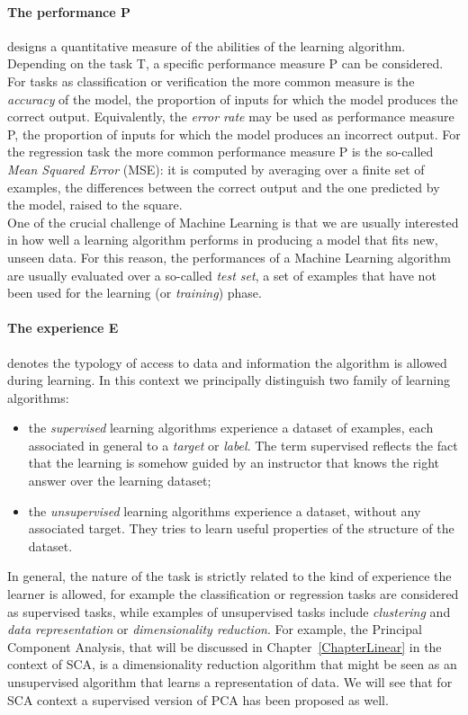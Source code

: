 \paragraph*{The performance P} designs a quantitative measure of the abilities of the learning algorithm. Depending on the task T, a specific performance measure P can be considered. For tasks as classification or verification the more common measure is the \emph{accuracy} of the model, \ie the proportion of inputs for which the model produces the correct output. Equivalently, the \emph{error rate} may be used as performance measure P, \ie the proportion of inputs for which the model produces an incorrect output. For the regression task the more common performance measure P is the so-called \emph{Mean Squared Error} (MSE): it is computed by averaging over a finite set of examples, the differences between the correct output and the one predicted by the model,  raised to the square. \\
One of the crucial challenge of Machine Learning is that we are usually interested in how well a learning algorithm performs in producing a model that fits new, unseen data. For this reason, the performances of a Machine Learning algorithm are usually evaluated over a so-called \emph{test set}, \ie a set of examples that have not been used for the learning (or \emph{training}) phase. 

\paragraph*{The experience E} denotes the typology of access to data and information the algorithm is allowed during learning. In this context we principally distinguish two family of learning algorithms: 
\begin{itemize}
\item the \emph{supervised} learning algorithms experience a dataset of examples, each associated in general to a \emph{target} or \emph{label}. The term supervised reflects the fact that the learning is somehow guided by an instructor that knows the right answer over the learning dataset;
\item the \emph{unsupervised} learning algorithms experience a dataset, without any associated target. They tries to learn useful properties of the structure of the dataset. 
\end{itemize}
In general, the nature of the task is strictly related to the kind of experience the learner is allowed, for example the classification or regression tasks are considered as supervised tasks, while examples of unsupervised tasks include \emph{clustering} and \emph{data representation} or \emph{dimensionality reduction}. For example, the Principal Component Analysis, that will be discussed in Chapter~\ref{ChapterLinear} in the context of SCA, is a dimensionality reduction algorithm that might be seen as an unsupervised algorithm that learns a representation of data. We will see that for SCA context a supervised version of PCA has been proposed as well. 


